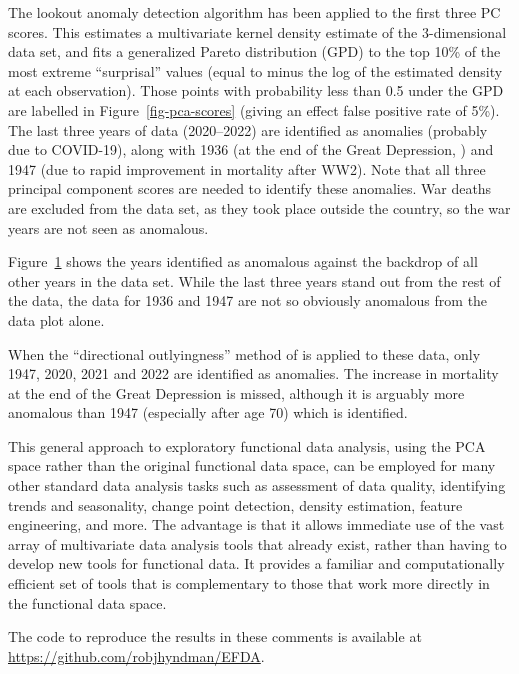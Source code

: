 \documentclass[
  11pt,
  a4paper,
]{article}
\makeatletter
\newcommand*\pandocbounded[1]{%
  \sbox\pandoc@box{#1}%
  \Gscale@div\@tempa{\textheight}{\dimexpr\ht\pandoc@box+\dp\pandoc@box\relax}%
  \Gscale@div\@tempb{\linewidth}{\wd\pandoc@box}%
  \ifdim\@tempb\p@<\@tempa\p@\let\@tempa\@tempb\fi%
  \ifdim\@tempa\p@<\p@\scalebox{\@tempa}{\usebox\pandoc@box}%
  \else\usebox{\pandoc@box}%
  \fi%
}
\makeatother
\begin{document}
The lookout anomaly detection algorithm \autocite{lookout2021} has been
applied to the first three PC scores. This estimates a multivariate
kernel density estimate of the 3-dimensional data set, and fits a
generalized Pareto distribution (GPD) to the top 10\% of the most
extreme ``surprisal'' values (equal to minus the log of the estimated
density at each observation). Those points with probability less than
0.5 under the GPD are labelled in Figure~\ref{fig-pca-scores} (giving an
effect false positive rate of 5\%). The last three years of data
(2020--2022) are identified as anomalies (probably due to COVID-19),
along with 1936 (at the end of the Great Depression,
\textcite{tapia2009life}) and 1947 (due to rapid improvement in
mortality after WW2). Note that all three principal component scores are
needed to identify these anomalies. War deaths are excluded from the
data set, as they took place outside the country, so the war years are
not seen as anomalous.

Figure~\ref{fig-outliers} shows the years identified as anomalous
against the backdrop of all other years in the data set. While the last
three years stand out from the rest of the data, the data for 1936 and
1947 are not so obviously anomalous from the data plot alone.

\begin{figure}[!htb]

\centering{

\pandocbounded{\texttt{[image: EFDA\_comments\_files/figure-pdf/fig-outliers-1.pdf]}}

}

\caption{\label{fig-outliers}}

\end{figure}%

When the ``directional outlyingness'' method of
\textcite{dai2019directional} is applied to these data, only 1947, 2020,
2021 and 2022 are identified as anomalies. The increase in mortality at
the end of the Great Depression is missed, although it is arguably more
anomalous than 1947 (especially after age 70) which is identified.

This general approach to exploratory functional data analysis, using the
PCA space rather than the original functional data space, can be
employed for many other standard data analysis tasks such as assessment
of data quality, identifying trends and seasonality, change point
detection, density estimation, feature engineering, and more. The
advantage is that it allows immediate use of the vast array of
multivariate data analysis tools that already exist, rather than having
to develop new tools for functional data. It provides a familiar and
computationally efficient set of tools that is complementary to those
that work more directly in the functional data space.

The code to reproduce the results in these comments is available at
\url{https://github.com/robjhyndman/EFDA}.


\printbibliography
\end{document}
